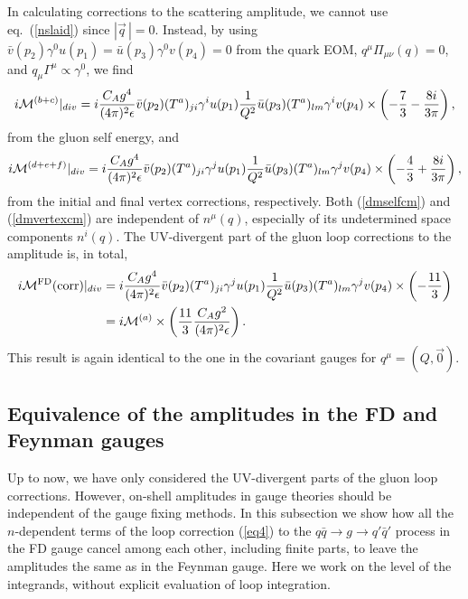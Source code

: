 \documentclass[preprint,amsmath,amssymb,superscriptaddress, floatfix,nofootinbib]{revtex4}
\begin{document}
In calculating corrections to the scattering amplitude, 
we cannot use eq.~(\ref{nslaid}) since $|\vec{q}\,|=0$. Instead, by using 
$\bar{v}(p_2)\gamma^0 u(p_1)=\bar{u}(p_3)\gamma^0 v(p_4)=0$ 
from the quark EOM, 
$q^{\mu}\Pi_{\mu\nu}(q)=0$, and $q_{\mu}\Gamma^{\mu}\propto\gamma^0$, we find 
%
\begin{equation}
i{\cal M}^{(b+c)}|_{div}  = 
i\frac{C_A g^4}{(4\pi)^2\epsilon}
\bar{v}(p_2)(T^a)_{ji} \gamma^{i}u(p_1) \frac{1}{Q^2}
\bar{u}(p_3)(T^a)_{lm}\gamma^{i} v(p_4) \times 
\left( -\frac{7}{3} -\frac{8i}{3\pi}\right) ,
\label{dmselfcm}
\end{equation}
%
from the gluon self energy, and 
%
\begin{equation}
i{\cal M}^{(d+e+f)}|_{div}  =  i\frac{C_A g^4}{(4\pi)^2\epsilon} 
\bar{v}(p_2)(T^a)_{ji}\gamma^j u(p_1) \frac{1}{Q^2}\bar{u}(p_3)(T^a)_{lm}
\gamma^j v(p_4)
\times  \left( -\frac{4}{3}+\frac{8i}{3\pi} \right) ,
\label{dmvertexcm} 
\end{equation}
from the initial and final vertex corrections, respectively. 
Both (\ref{dmselfcm}) and (\ref{dmvertexcm}) are 
independent of $n^{\mu}(q)$, especially of its undetermined space 
components $n^i(q)$. 
The UV-divergent part of the gluon loop corrections to the amplitude is, 
in total, 
\begin{align} 
i{\cal M}^{\rm FD}({\rm corr})|_{div} & =
i\frac{C_A g^4}{(4\pi)^2\epsilon} 
\bar{v}(p_2)(T^a)_{ji} \gamma^j u(p_1) \frac{1}{Q^2}
\bar{u}(p_3)(T^a)_{lm} \gamma^j v(p_4)
\times \left(  -\frac{11}{3} \right)  
\nonumber \\
& = i{\cal M}^{(a)} \times \left( 
\frac{11}{3}\frac{C_A g^2}{(4\pi)^2\epsilon} \right) .
\end{align}
This result is again identical to the one 
in the covariant gauges 
for $q^{\mu}=(Q,\vec{0})$. 



\subsection{Equivalence of the amplitudes in the FD and Feynman gauges}

Up to now, we have only considered the UV-divergent parts of the gluon loop 
corrections. However, on-shell amplitudes in gauge theories should be 
independent of the gauge fixing methods. In this subsection 
we show how all the $n$-dependent terms of the loop correction 
(\ref{eq4}) to the $q\bar{q}\to g\to q'\bar{q}'$ process 
in the FD gauge cancel among each other, including finite parts, 
to leave the amplitudes the same as in the Feynman gauge. 
Here we work on the level of the integrands, without
explicit evaluation of loop integration. 
\end{document}
